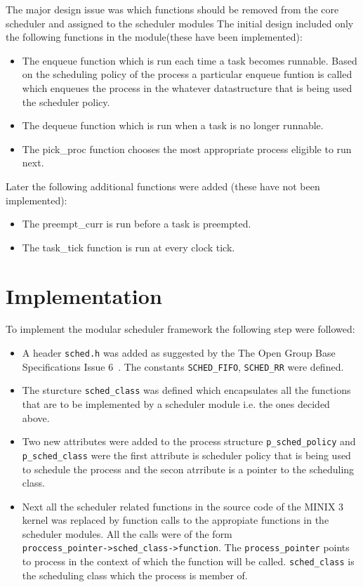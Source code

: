 The major design issue was which functions should be removed from the core scheduler and assigned to the scheduler modules
The initial design included only the following functions in the module(these have been implemented):
\begin{itemize}
\item The enqueue function which is run each time a task becomes runnable. Based on the scheduling policy of the process a particular
enqueue funtion is called which enqueues the process in the whatever datastructure that is being used the scheduler policy.
\item The dequeue function which is run when a task is no longer runnable.
\item The pick\_proc function chooses the most appropriate process eligible to run next.
\end{itemize}
Later the following additional functions were added (these have not been implemented):
\begin{itemize}
\item The preempt\_curr is run before a task is preempted.
\item The task\_tick function is run at every clock tick.
\end{itemize}

\section{Implementation}

To implement the modular scheduler framework the following step were followed:
\begin{itemize}
\item A header \verb|sched.h| was added as suggested by the The Open Group Base Specifications Issue 6~\cite{ie04}.
The constants \verb|SCHED_FIFO|, \verb|SCHED_RR| were defined. 
\item The sturcture \verb|sched_class| was defined which encapsulates all the functions that are to be implemented
by a scheduler module i.e. the ones decided above.
\item Two new attributes were added to the process structure \verb|p_sched_policy| and \verb|p_sched_class| were the
first attribute is scheduler policy that is being used to schedule the process and the secon atrribute is a pointer
to the scheduling class.
\item Next all the scheduler related functions in the source code of the MINIX 3 kernel
was replaced by function calls to the appropiate functions in the scheduler modules. All the calls were of the form\\
\verb|proccess_pointer->sched_class->function|. The \verb|process_pointer| points to process in the context of which 
the function will be called. \verb|sched_class| is the scheduling class which the process is member of.
\end{itemize}

